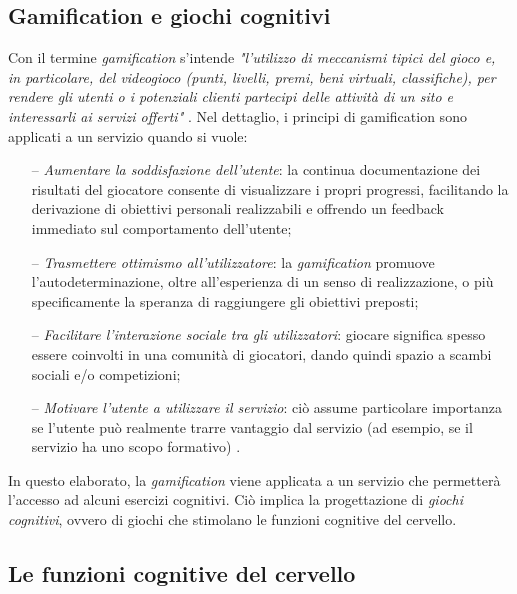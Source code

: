 \subsection{Gamification e giochi cognitivi}
\label{subsec:Sezione1.2.3}

Con il termine \textit{gamification} s'intende \textit{"l'utilizzo di
meccanismi tipici del gioco e, in particolare, del videogioco (punti, livelli,
premi, beni virtuali, classifiche), per rendere gli utenti o i potenziali
clienti partecipi delle attività di un sito e interessarli ai servizi offerti"}
\cite{GAMIFICATION}. Nel dettaglio, i principi di gamification sono applicati a
un servizio quando si vuole:
\begin{itemize}
  \item[--] \textit{Aumentare la soddisfazione dell'utente}: la continua
        documentazione dei risultati del giocatore consente di visualizzare i
        propri progressi, facilitando la derivazione di obiettivi personali
        realizzabili e offrendo un feedback immediato sul comportamento
        dell'utente;
  \item[--] \textit{Trasmettere ottimismo all'utilizzatore}: la
        \textit{gamification} promuove l'autodeterminazione, oltre
        all'esperienza di un senso di realizzazione, o più specificamente la
        speranza di raggiungere gli obiettivi preposti;
  \item[--] \textit{Facilitare l'interazione sociale tra gli utilizzatori}:
        giocare significa spesso essere coinvolti in una comunità di giocatori,
        dando quindi spazio a scambi sociali e/o competizioni;
  \item[--] \textit{Motivare l'utente a utilizzare il servizio}: ciò assume
        particolare importanza se l'utente può realmente trarre vantaggio dal
        servizio (ad esempio, se il servizio ha uno scopo formativo)
        \cite{GAMIFICATION_PURPOSE}.
\end{itemize}

In questo elaborato, la \textit{gamification} viene applicata a un servizio che
permetterà l'accesso ad alcuni esercizi cognitivi. Ciò implica la progettazione
di \textit{giochi cognitivi}, ovvero di giochi che stimolano le funzioni
cognitive del cervello.

\subsection{Le funzioni cognitive del cervello}
\label{subsec:Sezione1.2.4}

